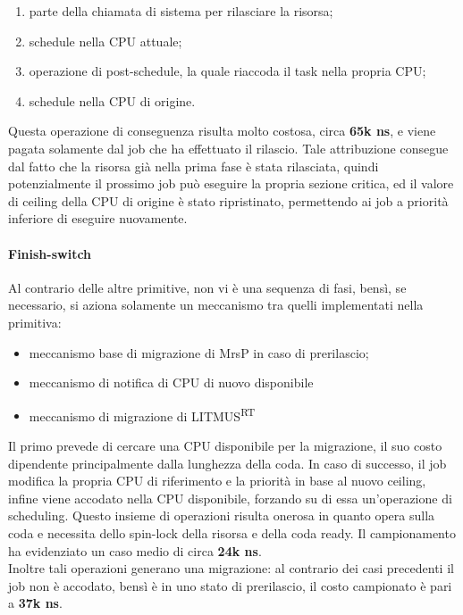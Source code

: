 {\begin{enumerate}
	\item parte della chiamata di sistema per rilasciare la risorsa;
	\item schedule nella CPU attuale;
	\item operazione di post-schedule, la quale riaccoda il task nella propria CPU;
	\item schedule nella CPU di origine.
\end{enumerate}

\noindent Questa operazione di conseguenza risulta molto costosa, circa \textbf{65k ns}, e viene pagata solamente dal job che ha effettuato il rilascio. Tale attribuzione consegue dal fatto che la risorsa già nella prima fase è stata rilasciata, quindi potenzialmente il prossimo job può eseguire la propria sezione critica, ed il valore di ceiling della CPU di origine è stato ripristinato, permettendo ai job a priorità inferiore di eseguire nuovamente.\\

\paragraph{Finish-switch} Al contrario delle altre primitive, non vi è una sequenza di fasi, bensì, se necessario, si aziona solamente un meccanismo tra quelli implementati nella primitiva:

\begin{itemize}
	\item meccanismo base di migrazione di MrsP in caso di prerilascio;
	\item meccanismo di notifica di CPU di nuovo disponibile
  \item meccanismo di migrazione di LITMUS\textsuperscript{RT} 
\end{itemize}

\noindent Il primo prevede di cercare una CPU disponibile per la migrazione, il suo costo dipendente principalmente dalla lunghezza della coda. In caso di successo, il job modifica la propria CPU di riferimento e la priorità in base al nuovo ceiling, infine viene accodato nella CPU disponibile, forzando su di essa un'operazione di scheduling. Questo insieme di operazioni risulta onerosa in quanto opera sulla coda e necessita dello spin-lock della risorsa e della coda ready. Il campionamento ha evidenziato un caso medio di circa \textbf{24k ns}.\\

\noindent Inoltre tali operazioni generano una migrazione: al contrario dei casi precedenti il job non è accodato, bensì è in uno stato di prerilascio, il costo campionato è pari a \textbf{37k ns}.\\

}

